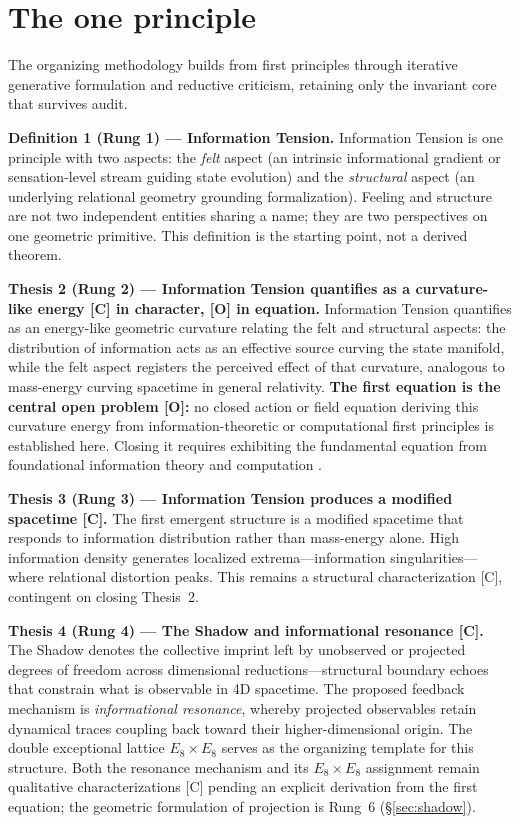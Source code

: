 \documentclass[11pt]{article}
\begin{document}
\section{The one principle}
\label{sec:principle}
The organizing methodology builds from first principles through iterative generative formulation and reductive criticism, retaining only the invariant core that survives audit.

\noindent\textbf{Definition 1 (Rung 1) --- Information Tension.} Information Tension is one principle with two aspects: the \emph{felt} aspect (an intrinsic informational gradient or sensation-level stream guiding state evolution) and the \emph{structural} aspect (an underlying relational geometry grounding formalization). Feeling and structure are not two independent entities sharing a name; they are two perspectives on one geometric primitive. This definition is the starting point, not a derived theorem.

\noindent\textbf{Thesis 2 (Rung 2) --- Information Tension quantifies as a curvature-like energy [C] in character, [O] in equation.} Information Tension quantifies as an energy-like geometric curvature relating the felt and structural aspects: the distribution of information acts as an effective source curving the state manifold, while the felt aspect registers the perceived effect of that curvature, analogous to mass-energy curving spacetime in general relativity. \textbf{The first equation is the central open problem [O]:} no closed action or field equation deriving this curvature energy from information-theoretic or computational first principles is established here. Closing it requires exhibiting the fundamental equation from foundational information theory and computation \cite{res-nova-repo}.

\noindent\textbf{Thesis 3 (Rung 3) --- Information Tension produces a modified spacetime [C].} The first emergent structure is a modified spacetime that responds to information distribution rather than mass-energy alone. High information density generates localized extrema---information singularities---where relational distortion peaks. This remains a structural characterization [C], contingent on closing Thesis~2.

\noindent\textbf{Thesis 4 (Rung 4) --- The Shadow and informational resonance [C].} The Shadow denotes the collective imprint left by unobserved or projected degrees of freedom across dimensional reductions---structural boundary echoes that constrain what is observable in 4D spacetime. The proposed feedback mechanism is \emph{informational resonance}, whereby projected observables retain dynamical traces coupling back toward their higher-dimensional origin. The double exceptional lattice $E_8 \times E_8$ serves as the organizing template for this structure. Both the resonance mechanism and its $E_8 \times E_8$ assignment remain qualitative characterizations [C] pending an explicit derivation from the first equation; the geometric formulation of projection is Rung~6 (\S\ref{sec:shadow}).
\end{document}
